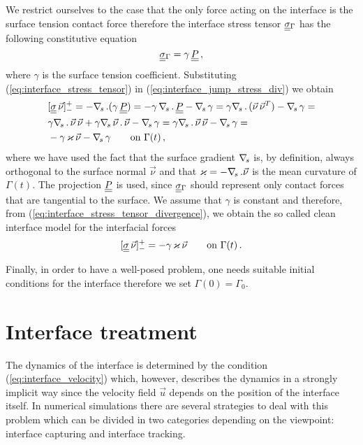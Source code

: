 We restrict ourselves to the case that the only force acting on the interface
is the surface tension contact force therefore the interface stress tensor
$\mat\sigma_\Gamma$ has the following constitutive equation
\begin{equation}\label{eq:interface_stress_tensor}
\mat\sigma_{\Gamma}=\gamma\,\mat P\,,
\end{equation}
where $\gamma$ is the surface tension coefficient. Substituting
(\ref{eq:interface_stress_tensor}) in (\ref{eq:interface_jump_stress_div}) we
obtain
\begin{equation}\label{eq:interface_stress_tensor_divergence}
\begin{split}
& [\mat\sigma\,\vec \nu]_-^+ = -\nabs\,.(\gamma\,\mat P)=-\gamma\,\nabs\,.\,\mat
P-\nabs\,\gamma = \gamma\nabs\,.\,(\vec\nu\,\vec\nu^T)-\nabs\,\gamma = \\
& \gamma\nabs\,.\,\vec\nu\,\vec\nu +\gamma\nabs\,\vec\nu\,.\,\vec\nu -
\nabs\,\gamma = \gamma\nabs\,.\,\vec\nu\,\vec\nu - \nabs\,\gamma = \\
& -\gamma\,\varkappa\,\vec\nu - \nabs\,\gamma \qquad \mbox{on } \Gamma(t)\,,
\end{split}
\end{equation}
where we have used the fact that the surface gradient $\nabla_{\!s}$ is, by definition,
always orthogonal to the surface normal $\vec\nu$ and that $\varkappa =
-\nabla_{\!s}\,.\vec\nu$ is the mean curvature of $\Gamma(t)$. The projection $\mat P$
is used, since $\mat\sigma_{\Gamma}$ should represent only contact forces that
are tangential to the surface. We assume that $\gamma$ is constant and
therefore, from (\ref{eq:interface_stress_tensor_divergence}), we obtain the
so called clean interface model for the interfacial forces
\begin{equation}\label{eq:interface_jump_stress}
[\mat\sigma\,\vec \nu]_-^+ = -\gamma\,\varkappa\,\vec\nu \qquad \mbox{on }
\Gamma(t)\,.
\end{equation}

Finally, in order to have a well-posed problem, one needs suitable initial
conditions for the interface therefore we set $\Gamma(0)=\Gamma_0$.

\section{Interface treatment}\label{sec:interface_treatment}
The dynamics of the interface is determined by the condition
(\ref{eq:interface_velocity}) which, however, describes the dynamics in a
strongly implicit way since the velocity field $\vec u$ depends on the
position of the interface itself. In numerical simulations there are
several strategies to deal with this problem which can be divided in two
categories depending on the viewpoint: interface capturing and interface
tracking.

